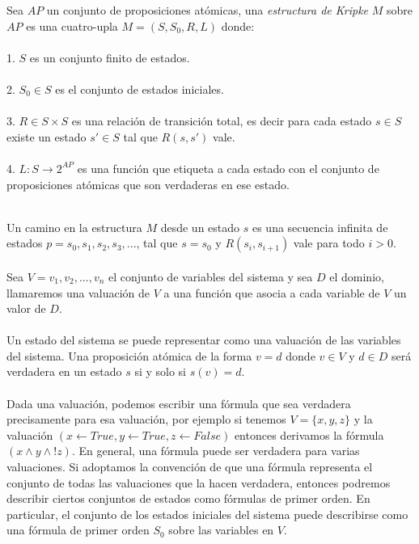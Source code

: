\begin{definition}
Sea $AP$ un conjunto de proposiciones atómicas, una \emph{estructura de Kripke} $M$ sobre $AP$ es una cuatro-upla $M = (S, S_{0}, R, L)$ donde: \\
\\
1. $S$ es un conjunto finito de estados.\\
\\
2. $S_{0} \in S$ es el conjunto de estados iniciales.\\
\\
3. $R \in S \times S$ es una relación de transición total, es decir para cada estado $s \in S$ existe un estado $s' \in S$ tal que $R(s,s')$ vale.\\
\\
4. $L \colon S \to 2^{AP}$ es una función que etiqueta a cada estado con el conjunto de proposiciones atómicas que son verdaderas en ese estado.\\
\\
\end{definition}
\noindent Un camino en la estructura $M$ desde un estado $s$ es una secuencia infinita de estados $p = s_{0}, s_{1}, s_{2}, s_{3}, ...$, tal que $s = s_{0}$ y $R(s_{i},s_{i+1})$ vale para todo $i>0$.\\
\\
Sea $V = {v_{1}, v_{2}, ..., v_{n}}$ el conjunto de variables del sistema y sea $D$ el dominio, llamaremos una valuación de $V$ a una función que asocia a cada variable de $V$ un valor de $D$.\\
\\
Un estado del sistema se puede representar como una valuación de las variables del sistema. Una proposición atómica de la forma $v = d$ donde $v \in V$ y $d \in D$ será verdadera en un estado $s$ si y solo si $s(v) = d$.\\
\\
Dada una valuación, podemos escribir una fórmula que sea verdadera precisamente para esa valuación, por ejemplo si tenemos $V = \{x,y,z\}$ y la valuación $(x \gets True, y \gets True, z \gets False)$ entonces derivamos la fórmula $(x \land y \land !z)$. En general, una fórmula puede ser verdadera para varias valuaciones. Si adoptamos la convención de que una fórmula representa el conjunto de todas las valuaciones que la hacen verdadera, entonces podremos describir ciertos conjuntos de estados como fórmulas de primer orden. En particular, el conjunto de los estados iniciales del sistema puede describirse como una fórmula de primer orden $S_{0}$ sobre las variables en $V$.\\
